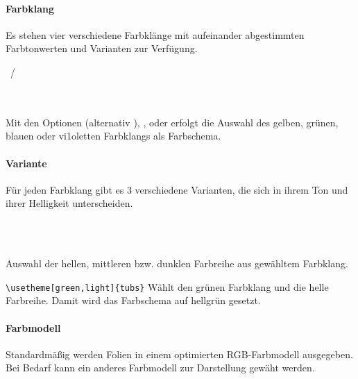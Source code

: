 
\paragraph{Farbklang}
Es stehen vier verschiedene Farbklänge mit aufeinander abgestimmten Farbtonwerten
und Varianten zur Verfügung.

\begin{Declaration}
  ~/~\\
  \\
  \\
\end{Declaration}

Mit den Optionen  (alternativ ),
,  oder  erfolgt die Auswahl des
gelben, grünen, blauen oder vi1oletten Farbklangs als Farbschema.

\paragraph{Variante}
Für jeden Farbklang gibt es 3 verschiedene Varianten, die sich in ihrem Ton
und ihrer Helligkeit unterscheiden.

\begin{Declaration}
  \\
  \\
\end{Declaration}

Auswahl der hellen, mittleren bzw. dunklen Farbreihe aus gewähltem Farbklang.

\begin{example}
\lstinline!\usetheme[green,light]{tubs}! Wählt den grünen Farbklang und die
helle Farbreihe. Damit wird das Farbschema auf hellgrün gesetzt.
\end{example}

\paragraph{Farbmodell}
Standardmäßig werden Folien in einem optimierten RGB-Farbmodell ausgegeben.
Bei Bedarf kann ein anderes Farbmodell zur Darstellung gewäht werden.


\begin{Declaration}
  \\
  \\
\end{Declaration}


